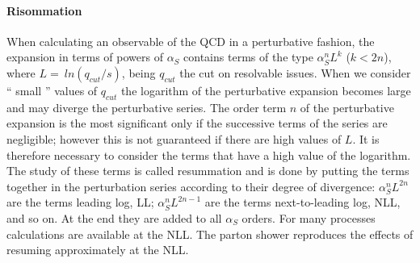 \paragraph{Risommation} When calculating an observable of the QCD in a perturbative fashion, the expansion in terms of powers of $ \alpha_S $ contains terms of the type $ \alpha_S ^ n L ^ k $ ($ k <2n $), where $ L = \ ln (q_{cut} / s) $, being $ q_{cut} $ the cut on resolvable issues. When we consider `` small '' values ​​of $ q_{cut} $ the logarithm of the perturbative expansion becomes large and may diverge the perturbative series.
The order term $ n $ of the perturbative expansion is the most significant only if the successive terms of the series are negligible; however this is not guaranteed if there are high values ​​of $ L $. It is therefore necessary to consider the terms that have a high value of the logarithm. The study of these terms is called resummation and is done by putting the terms together in the perturbation series according to their degree of divergence: $ \alpha_S ^ n L ^ {2n} $ are the terms leading log, LL; $ \alpha_S ^ n L ^ {2n-1} $ are the terms next-to-leading log, NLL, and so on. At the end they are added to all $ \alpha_S $ orders. For many processes calculations are available at the NLL.
The parton shower reproduces the effects of resuming approximately at the NLL.


